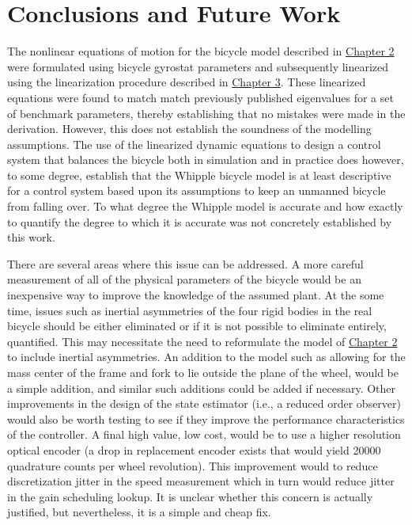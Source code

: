 \chapter{Conclusions and Future Work}
The nonlinear equations of motion for the bicycle model described in
\hyperref[chapter2]{Chapter 2} were formulated using bicycle gyrostat
parameters and subsequently linearized using the linearization procedure
described in \hyperref[chapter3]{Chapter 3}. These linearized equations were
found to match  match previously published eigenvalues for a set of benchmark
parameters, thereby establishing that no mistakes were made in the derivation.
However, this does not establish the soundness of the modelling assumptions.
The use of the linearized dynamic equations to design a control system that
balances the bicycle both in simulation and in practice does however, to some
degree, establish that the Whipple bicycle model is at least descriptive for a
control system based upon its assumptions to keep an unmanned bicycle from
falling over. To what degree the Whipple model is accurate and how exactly to
quantify the degree to which it is accurate was not concretely established by
this work.

There are several areas where this issue can be addressed. A more careful
measurement of all of the physical parameters of the bicycle would be an
inexpensive way to improve the knowledge of the assumed plant. At the some
time, issues such as inertial asymmetries of the four rigid bodies in the real
bicycle should be either eliminated or if it is not possible to eliminate
entirely, quantified. This may necessitate the need to reformulate the model of
\hyperref[chapter2]{Chapter 2} to include inertial asymmetries. An addition to
the model such as allowing for the mass center of the frame and fork to lie
outside the plane of the wheel, would be a simple addition, and similar such
additions could be added if necessary. Other improvements in the design of the
state estimator (i.e., a reduced order observer) would also be worth testing to
see if they improve the performance characteristics of the controller. A final
high value, low cost, would be to use a higher resolution optical encoder (a
drop in replacement encoder exists that would yield 20000 quadrature counts per
wheel revolution). This improvement would to reduce discretization jitter in
the speed measurement which in turn would reduce jitter in the gain scheduling
lookup. It is unclear whether this concern is actually justified, but
nevertheless, it is a simple and cheap fix.

